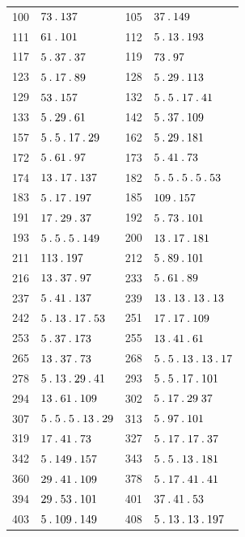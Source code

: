 \begin{longtable}{@{}r|l@{\qquad}r|l@{}}
100 & $73\mathbin{.} 137$ & 105 & $37\mathbin{.} 149$\\
111 & $61\mathbin{.} 101$ & 112 & $5\mathbin{.} 13\mathbin{.} 193$\\
117 & $5\mathbin{.} 37\mathbin{.} 37$ & 119 & $73\mathbin{.} 97$\\
123 & $5\mathbin{.} 17\mathbin{.} 89$ & 128 & $5\mathbin{.} 29\mathbin{.} 113$\\
129 & $53\mathbin{.} 157$ & 132 & $5\mathbin{.} 5\mathbin{.} 17\mathbin{.} 41$\\
133 & $5\mathbin{.} 29\mathbin{.} 61$ & 142 & $5\mathbin{.} 37\mathbin{.} 109$\\
157 & $5\mathbin{.} 5\mathbin{.} 17\mathbin{.} 29$ & 162 & $5\mathbin{.} 29\mathbin{.} 181$\\
172 & $5\mathbin{.} 61\mathbin{.} 97$ & 173 & $5\mathbin{.} 41\mathbin{.} 73$\\
174 & $13\mathbin{.} 17\mathbin{.} 137$ & 182 & $5\mathbin{.} 5\mathbin{.} 5\mathbin{.} 5\mathbin{.} 53$\\
183 & $5\mathbin{.} 17\mathbin{.} 197$ & 185 & $109\mathbin{.} 157$\\
191 & $17\mathbin{.} 29\mathbin{.} 37$ & 192 & $5\mathbin{.} 73\mathbin{.} 101$\\
193 & $5\mathbin{.} 5\mathbin{.} 5\mathbin{.} 149$ & 200 & $13\mathbin{.} 17\mathbin{.} 181$\\
211 & $113\mathbin{.} 197$ & 212 & $5\mathbin{.} 89\mathbin{.} 101$\\
216 & $13\mathbin{.} 37\mathbin{.} 97$ & 233 & $5\mathbin{.} 61\mathbin{.} 89$\\
237 & $5\mathbin{.} 41\mathbin{.} 137$ & 239 & $13\mathbin{.} 13\mathbin{.} 13\mathbin{.} 13$\\
242 & $5\mathbin{.} 13\mathbin{.} 17\mathbin{.} 53$ & 251 & $17\mathbin{.} 17\mathbin{.} 109$\\
253 & $5\mathbin{.} 37\mathbin{.} 173$ & 255 & $13\mathbin{.} 41\mathbin{.} 61$\\
265 & $13\mathbin{.} 37\mathbin{.} 73$ & 268 & $5\mathbin{.} 5\mathbin{.} 13\mathbin{.} 13\mathbin{.} 17$\\
278 & $5\mathbin{.} 13\mathbin{.} 29\mathbin{.} 41$ & 293 & $5\mathbin{.} 5\mathbin{.} 17\mathbin{.} 101$\\
294 & $13\mathbin{.} 61\mathbin{.} 109$ & 302 & $5\mathbin{.} 17\mathbin{.} 29\;37$\\
307 & $5\mathbin{.} 5\mathbin{.} 5\mathbin{.} 13\mathbin{.} 29$ & 313 & $5\mathbin{.} 97\mathbin{.} 101$\\
319 & $17\mathbin{.} 41\mathbin{.} 73$ & 327 & $5\mathbin{.} 17\mathbin{.} 17\mathbin{.} 37$\\
342 & $5\mathbin{.} 149\mathbin{.} 157$ & 343 & $5\mathbin{.} 5\mathbin{.} 13\mathbin{.} 181$\\
360 & $29\mathbin{.} 41\mathbin{.} 109$ & 378 & $5\mathbin{.} 17\mathbin{.} 41\mathbin{.} 41$\\
394 & $29\mathbin{.} 53\mathbin{.} 101$ & 401 & $37\mathbin{.} 41\mathbin{.} 53$\\
403 & $5\mathbin{.} 109\mathbin{.} 149$ & 408 & $5\mathbin{.} 13\mathbin{.} 13\mathbin{.} 197$\\

\end{longtable}
